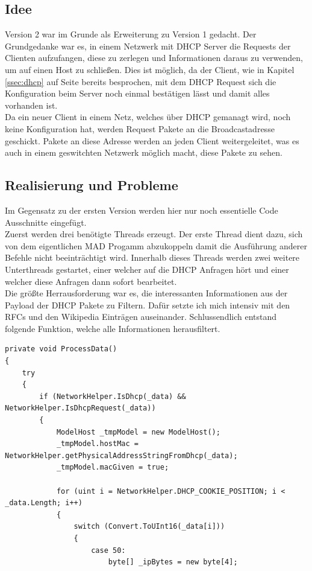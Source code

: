 \documentclass[12pt,a4paper]{report}
\begin{document}
\begin{onehalfspace}
\subsection{Idee}
Version 2 war im Grunde als Erweiterung zu Version 1 gedacht. Der Grundgedanke war es, in einem Netzwerk mit DHCP Server die Requests der Clienten aufzufangen, diese zu zerlegen und Informationen daraus zu verwenden, um auf einen Host zu schließen. Dies ist möglich, da der Client, wie in Kapitel \ref{ssec:dhcp} auf Seite \pageref{ssec:dhcp} bereits besprochen, mit dem DHCP Request sich die Konfiguration beim Server noch einmal bestätigen lässt und damit alles vorhanden ist.\\
Da ein neuer Client in einem Netz, welches über DHCP gemanagt wird, noch keine Konfiguration hat, werden Request Pakete an die Broadcastadresse geschickt. Pakete an diese Adresse werden an jeden Client weitergeleitet, was es auch in einem geswitchten Netzwerk möglich macht, diese Pakete zu sehen.\\

\subsection{Realisierung und Probleme}
Im Gegensatz zu der ersten Version werden hier nur noch essentielle Code Ausschnitte eingefügt.\\
Zuerst werden drei benötigte Threads erzeugt. Der erste Thread dient dazu, sich von dem eigentlichen MAD Progamm abzukoppeln damit die Ausführung anderer Befehle nicht beeinträchtigt wird. Innerhalb dieses Threads werden zwei weitere Unterthreads gestartet, einer welcher auf die DHCP Anfragen hört und einer welcher diese Anfragen dann sofort bearbeitet.\\
Die größte Herrausforderung war es, die interessanten Informationen aus der Payload der DHCP Pakete zu Filtern. Dafür setzte ich mich intensiv mit den RFCs und den Wikipedia Einträgen auseinander. Schlussendlich entstand folgende Funktion, welche alle Informationen herausfiltert.

\begin{lstlisting}
private void ProcessData()
{
    try
    {
    	if (NetworkHelper.IsDhcp(_data) && NetworkHelper.IsDhcpRequest(_data))
        {
        	ModelHost _tmpModel = new ModelHost();
            _tmpModel.hostMac = NetworkHelper.getPhysicalAddressStringFromDhcp(_data);
            _tmpModel.macGiven = true;

    		for (uint i = NetworkHelper.DHCP_COOKIE_POSITION; i < _data.Length; i++)
            {
            	switch (Convert.ToUInt16(_data[i]))
                {
                	case 50:
                    	byte[] _ipBytes = new byte[4];


\end{lstlisting}
\end{onehalfspace}
\end{document}
